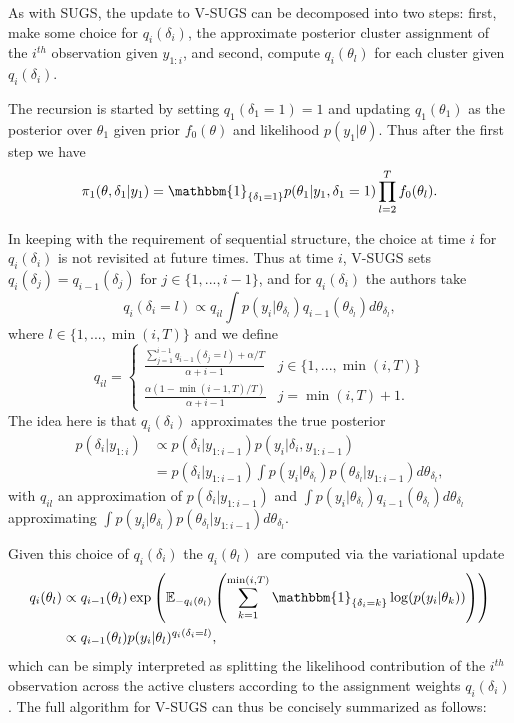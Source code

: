 \documentclass{uwstat572}
\begin{document}
As with SUGS, the update to V-SUGS can be decomposed into two steps: first, make some choice for $q_i(\delta_i)$, the approximate posterior cluster assignment of the $i^{th}$ observation given $y_{1:i}$, and second, compute $q_i(\theta_l)$ for each cluster given $q_i(\delta_i)$. 

The recursion is started by setting $q_1(\delta_1 = 1) = 1$ and updating $q_1(\theta_1)$ as the posterior over $\theta_1$ given prior $f_0(\theta)$ and likelihood $p(y_1 |\theta)$. Thus after the first step we have
$$ \pi_1(\theta,\delta_1 | y_1) = \mathbbm{1}_{\{\delta_1 = 1\}} p(\theta_1 | y_1,\delta_1 = 1)\prod_{l=2}^T f_0(\theta_l).$$

In keeping with the requirement of sequential structure, the choice at time $i$ for $q_i(\delta_i)$ is not revisited at future times. Thus at time $i$, V-SUGS sets $q_i(\delta_j) = q_{i-1}(\delta_j)$ for $j \in \{1,...,i-1\}$, and for $q_i(\delta_i)$ the authors take
$$ q_i(\delta_i = l) \propto q_{il} \int p(y_i | \theta_{\delta_l}) q_{i-1}(\theta_{\delta_l}) d\theta_{\delta_l},$$
where $l \in \{1,..., \min(i,T)\}$ and we define
\[ q_{il} = \begin{cases} 
      \frac{\sum_{j=1}^{i-1} q_{i-1}(\delta_j = l)+\alpha/T}{\alpha+i-1}& j \in \{1,...,\min(i,T)\} \\
      \frac{\alpha(1-\min(i-1,T)/T)}{\alpha+i-1} & j = \min(i,T) +1.
   \end{cases}
\]
The idea here is that $q_i(\delta_i)$ approximates the true posterior
\begin{align}
p(\delta_i | y_{1:i}) &\propto p(\delta_i | y_{1:i-1})p(y_i | \delta_i,y_{1:i-1}) \nonumber \\
&= p(\delta_i | y_{1:i-1}) \int p(y_i | \theta_{\delta_l}) p(\theta_{\delta_l}|y_{1:i-1}) d\theta_{\delta_l}, \nonumber
\end{align}
with $q_{il}$ an approximation of $p(\delta_i | y_{1:i-1})$ and $ \int p(y_i | \theta_{\delta_l}) q_{i-1}(\theta_{\delta_l}) d\theta_{\delta_l}$ approximating $\int p(y_i | \theta_{\delta_l}) p(\theta_{\delta_l}|y_{1:i-1}) d\theta_{\delta_l}$. 

Given this choice of $q_i(\delta_i)$ the $q_i(\theta_l)$ are computed via the variational update
\begin{align}
q_i(\theta_l) &\propto q_{i-1}(\theta_l) \exp \left( \mathbb{E}_{-q_i(\theta_l)} \left( \sum_{k=1}^{\min(i,T)} \mathbbm{1}_{\{\delta_i = k\}} \log(p(y_i | \theta_k))\right)\right) \nonumber \\
&\propto q_{i-1}(\theta_l)p(y_i | \theta_l)^{q_i(\delta_i=l)}, \nonumber
\end{align}
which can be simply interpreted as splitting the likelihood contribution of the $i^{th}$ observation across the active clusters according to the assignment weights $q_i(\delta_i)$. The full algorithm for V-SUGS can thus be concisely summarized as follows:
\medskip
\end{document}
